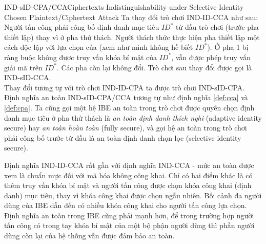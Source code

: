 \documentclass[class=report, crop=false]{standalone}
\begin{document}
			\begin{game}{IND-sID-CPA/CCA}{Ciphertexts Indistinguishability under Selective Identity Chosen Plaintext/Ciphertext Attack}
				Ta thay đổi trò chơi IND-ID-CCA như sau: \\[0.2\baselineskip] \indent
				Người tấn công \adversary phải công bố định danh mục tiêu $ID^*$ từ đầu trò chơi (trước pha thiết lập) thay vì ở pha thử thách. Người thách thức \challenger thực hiện pha thiết lập một cách độc lập với lựa chọn của \adversary (\challenger xem như mình không hề biết $ID^*$). Ở pha 1 \adversary bị ràng buộc không được truy vấn khóa bí mật của $ID^*$, \challenger vẫn được phép truy vấn giải mã trên $ID^*$. Các pha còn lại không đổi. Trò chơi sau thay đổi được gọi là IND-sID-CCA. \\[0.2\baselineskip] \indent
				Thay đổi tương tự với trò chơi IND-ID-CPA ta được trò chơi IND-sID-CPA. \\ \indent
				Định nghĩa an toàn IND-sID-CPA/CCA tương tự như định nghĩa \ref{def:cca} và \ref{def:cpa}. Ta cũng gọi một hệ IBE an toàn trong trò chơi \adversary được quyền chọn định danh mục tiêu ở pha thử thách là \textit{an toàn định danh thích nghi} (adaptive identity secure) hay \textit{an toàn hoàn toàn} (fully secure), và gọi hệ an toàn trong trò chơi \adversary phải công bố trước từ đầu là an toàn định danh chọn lọc (selective identity secure).
			\end{game}
			\vspace{\baselineskip}
			\begin{remark}
				Định nghĩa IND-ID-CCA rất gần với định nghĩa IND-CCA - mức an toàn được xem là chuẩn mực đối với mã hóa không công khai. Chỉ có hai điểm khác là có thêm truy vấn khóa bí mật và người tấn công được chọn khóa công khai (định danh) mục tiêu, thay vì khóa công khai được chọn ngẫu nhiên. Bối cảnh đa người dùng của IBE dẫn đến có nhiều khóa công khai cho người tấn công lựa chọn. Định nghĩa an toàn trong IBE cũng phải mạnh hơn, để trong trường hợp người tấn công có trong tay khóa bí mật của một bộ phận người dùng thì phần người dùng còn lại của hệ thống vẫn được đảm bảo an toàn.
			\end{remark}
\end{document}
